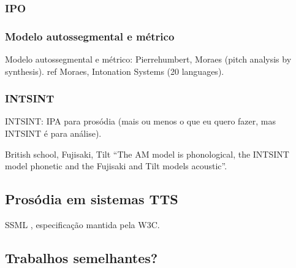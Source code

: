 \subsubsection{IPO}
\subsubsection{Modelo autossegmental e métrico}
Modelo autossegmental e métrico: Pierrehumbert, Moraes (pitch analysis by synthesis).
ref Moraes, Intonation Systems (20 languages).
\subsubsection{INTSINT}
INTSINT: IPA para prosódia (mais ou menos o que eu quero fazer, mas INTSINT é
para análise).

British school, Fujisaki, Tilt
``The AM model is phonological, the INTSINT model phonetic and the Fujisaki and Tilt models acoustic''.
\subsection{Prosódia em sistemas TTS}
SSML \cite{SSML}, especificação mantida pela W3C.
\subsection{Trabalhos semelhantes?}